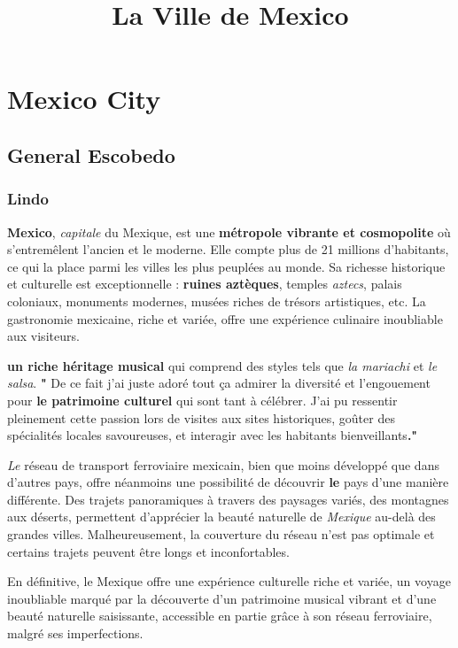 \documentclass[12pt, a4paper]{article}
\title{La Ville de Mexico}
\author{}
\date{}
\begin{document}
   \maketitle

\section*{Mexico City}

\subsection{General Escobedo}

\subsubsection{Lindo}

\textbf{Mexico}, \textit{capitale} du Mexique, est une \textbf{métropole vibrante et cosmopolite} où s'entremêlent l'ancien et le moderne. Elle compte plus de 21 millions d'habitants, ce qui la place parmi les villes les plus peuplées au monde. Sa richesse historique et culturelle est exceptionnelle : \textbf{ruines aztèques}, temples \textit{aztecs}, palais coloniaux, monuments modernes, musées riches de trésors artistiques, etc. La gastronomie mexicaine, riche et variée, offre une expérience culinaire inoubliable aux visiteurs.

\textbf{un riche héritage musical} qui comprend des styles tels que \textit{la mariachi} et \textit{le salsa}. \textbf{"}
De ce fait j'ai juste adoré tout ça admirer la diversité et l’engouement pour \textbf{le patrimoine culturel} qui sont tant à célébrer. J’ai pu ressentir pleinement cette passion lors de visites aux sites historiques, goûter des spécialités locales savoureuses, et interagir avec les habitants bienveillants\textbf{."}


{}

\textit{Le} réseau de transport ferroviaire mexicain, bien que moins développé que dans d’autres pays, offre néanmoins une possibilité de découvrir \textbf{le} pays d’une manière différente.  Des trajets panoramiques à travers des paysages variés, des montagnes aux déserts, permettent d’apprécier la beauté naturelle de \textit{Mexique} au-delà des grandes villes.  Malheureusement, la couverture du réseau n’est pas optimale et certains trajets peuvent être longs et inconfortables.

En définitive, le Mexique offre une expérience culturelle riche et variée, un voyage inoubliable marqué par la découverte d'un patrimoine musical vibrant et d'une beauté naturelle saisissante, accessible en partie grâce à son réseau ferroviaire, malgré ses imperfections.
\end{document}

